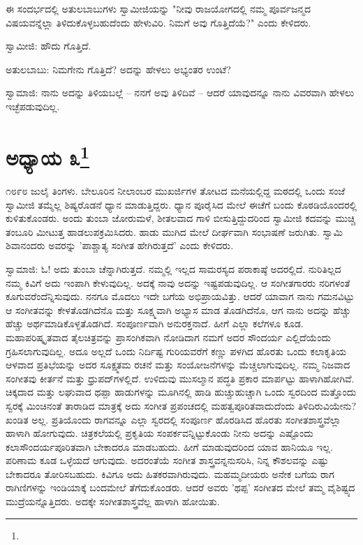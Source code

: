ಈ ಸಂದರ್ಭದಲ್ಲಿ ಅತುಲಬಾಬುಗಳು ಸ್ವಾಮೀಜಿಯನ್ನು "ನೀವು ರಾಜಯೋಗದಲ್ಲಿ ನಮ್ಮ ಪೂರ್ವಜನ್ಮದ ವಿಷಯವನ್ನೆಲ್ಲಾ ತಿಳಿದುಕೊಳ್ಳಬಹುದೆಂದು ಹೇಳುವಿರಿ. ನಿಮಗೆ ಅವು ಗೊತ್ತಿದೆಯೆ?" ಎಂದು ಕೇಳಿದರು.

ಸ್ವಾಮೀಜಿ: ಹೌದು ಗೊತ್ತಿದೆ.

ಅತುಲಬಾಬು: ನಿಮಗೇನು ಗೊತ್ತಿದೆ? ಅದನ್ನು ಹೇಳಲು ಅಭ್ಯಂತರ ಉಂಟೆ?

ಸ್ವಾಮಾಜಿ: ನಾನು ಅದನ್ನು ತಿಳಿಯಬಲ್ಲೆ – ನನಗೆ ಅವು ತಿಳಿದಿವೆ – ಆದರೆ ಯಾವುದನ್ನೂ ನಾನು ವಿವರವಾಗಿ ಹೇಳಲು ಇಚ್ಛೆಪಡುವುದಿಲ್ಲ.

\newpage

\chapter[ಅಧ್ಯಾಯ ೩]{ಅಧ್ಯಾಯ ೩\protect\footnote{}}

೧೮೯೮ ಜುಲೈ ತಿಂಗಳು. ಬೇಲೂರಿನ ನೀಲಾಂಬರ ಮುಖರ್ಜಿಗಳ ತೋಟದ ಮನೆಯಲ್ಲಿದ್ದ ಮಠದಲ್ಲಿ ಒಂದು ಸಂಜೆ ಸ್ವಾಮೀಜಿ ತಮ್ಮೆಲ್ಲ ಶಿಷ್ಯರೊಡನೆ ಧ್ಯಾನ ಮಾಡುತ್ತಿದ್ದರು. ಧ್ಯಾನ ಪೂರೈಸಿದ ಮೇಲೆ ಈಚೆಗೆ ಬಂದು ಕೊಠಡಿಯೊಂದರಲ್ಲಿ ಕುಳಿತುಕೊಂಡರು. ಅಂದು ತುಂಬಾ ಜೋರುಮಳೆ, ಶೀತಲವಾದ ಗಾಳಿ ಬೀಸುತ್ತಿದ್ದುದರಿಂದ ಸ್ವಾಮೀಜಿ ಕದವನ್ನು ಮುಚ್ಚಿ ತಂಬೂರಿ ಮೀಟುತ್ತ ಹಾಡಲುಪಕ್ರಮಿಸಿದರು. ಹಾಡು ಮುಗಿದ ಮೇಲೆ ದೀರ್ಘವಾಗಿ ಸಂಭಾಷಣೆ ಜರುಗಿತು. ಸ್ವಾಮಿ ಶಿವಾನಂದರು ಅವರನ್ನು 'ಪಾಶ್ಚಾತ್ಯ ಸಂಗೀತ ಹೇಗಿರುತ್ತದೆ' ಎಂದು ಕೇಳಿದರು.

ಸ್ವಾಮಾಜಿ: ಓ! ಅದು ತುಂಬಾ ಚೆನ್ನಾಗಿರುತ್ತದೆ. ನಮ್ಮಲ್ಲಿ ಇಲ್ಲದ ಸಾಮರಸ್ಯದ ಪರಾಕಾಷ್ಠೆ ಅದರಲ್ಲಿದೆ. ನುರಿತಿಲ್ಲದ ನಮ್ಮ ಕಿವಿಗೆ ಅದು ಇಂಪಾಗಿ ಕೇಳುವುದಿಲ್ಲ. ಅದಕ್ಕೆ ನಾವು ಅದನ್ನು ಇಷ್ಟಪಡುವುದಿಲ್ಲ. ಆ ಸಂಗೀತಗಾರರು ನರಿಗಳಂತೆ ಕೂಗುವರೆಂದೆನ್ನಿಸುವುದು. ನನಗೂ ಮೊದಲು ಇದೇ ಬಗೆಯ ಅಭಿಪ್ರಾಯವಿತ್ತು. ಆದರೆ ಯಾವಾಗ ನಾನು ಗಮನವಿಟ್ಟು ಆ ಸಂಗೀತವನ್ನು ಕೇಳತೊಡಗಿದೆನೊ ಮತ್ತು ಸೂಕ್ಷ್ಮವಾಗಿ ಅಭ್ಯಾಸ ಮಾಡ ತೊಡಗಿದೆನೊ, ಆಗ ನಾನು ಅದನ್ನು ಹೆಚ್ಚು ಹೆಚ್ಚು ಅರ್ಥಮಾಡಿಕೊಳ್ಳತೊಡಗಿದೆ. ಸಂಪೂರ್ಣವಾಗಿ ಅನುರಕ್ತನಾದೆ. ಹೀಗೆ ಎಲ್ಲಾ ಕಲೆಗಳೂ ಕೂಡ. ಮಹಾಪರಿಷ್ಕೃತವಾದ ತೈಲಚಿತ್ರವನ್ನು ಪ್ರಾಸಂಗಿಕವಾಗಿ ನೋಡಿದಾಗ ನಮಗೆ ಅದರ ಸೌಂದರ್ಯ ಎಲ್ಲಿದೆಯೆಂದು ಗ್ರಹಿಸಲಾಗುವುದಿಲ್ಲ. ಅದೂ ಅಲ್ಲದೆ ಒಂದು ನಿರ್ದಿಷ್ಟ ಗುರಿಯವರೆಗೆ ಕಣ್ಣು ಪಳಗಿದ ಹೊರತು ಒಂದು ಕಲಾಕೃತಿಯ ಆಳವಾದ ಪ್ರತಿಭೆಯನ್ನು ಅದರ ಸೂಕ್ಷ್ಮತಮ ರಚನೆ ಮತ್ತು ಸಂಯೋಜನೆಗಳನ್ನು ಮೆಚ್ಚಲಾಗುವುದಿಲ್ಲ. ನಮ್ಮ ನಿಜವಾದ ಸಂಗೀತವು ಕೀರ್ತನೆ ಮತ್ತು ಧ್ರುಪದ್‌ಗಳಲ್ಲಿದೆ. ಉಳಿದುವು ಮುಸಲ್ಮಾನ ಪದ್ಧತಿ ಪ್ರಕಾರ ಮಾರ್ಪಟ್ಟು ಹಾಳಾಗಿಹೋಗಿವೆ. ಚಿಕ್ಕದಾದ ಮತ್ತು ಲಘುವಾದ ಥಪ್ಪಾ ಹಾಡುಗಳನ್ನು ಮೂಗಿನಲ್ಲಿ ಹಾಡಿ ಹುಚ್ಚುಹುಚ್ಚಾಗಿ ಒಂದು ಸ್ವರದಿಂದ ಮತ್ತೊಂದು ಸ್ವರಕ್ಕೆ ಮಿಂಚಿನಂತೆ ತಾರಾಡಿದ ಮಾತ್ರಕ್ಕೆ ಅದು ಸಂಗೀತ ಪ್ರಪಂಚದಲ್ಲಿ ಮಹತ್ವಪೂರಿತವಾದುದೆಂದು ತಿಳಿದಿರುವಿಯೇನು? ಖಂಡಿತ ಅಲ್ಲ. ಪ್ರತಿಯೊಂದು ರಾಗವನ್ನೂ ಎಲ್ಲಾ ಸ್ವರದಲ್ಲಿ ಸಂಪೂರ್ಣ ಹೊರಡಿಸಿದ ಹೊರತು ಸಂಗೀತಶಾಸ್ತ್ರವೆಲ್ಲಾ ಹಾಳಾಗಿ ಹೋಗುವುದು. ಚಿತ್ರಕಲೆಯಲ್ಲಿ ಪ್ರಕೃತಿಯ ಸಂಪರ್ಕವನ್ನಿಟ್ಟುಕೊಂಡು ನೀನು ಅದನ್ನು ಎಷ್ಟೊಂದು ಕಲಾಸೌಂದರ್ಯಪೂರಿತವಾಗಿ ಬೇಕಾದರೂ ಮಾಡಬಹುದು. ಹೀಗೆ ಮಾಡುವುದರಿಂದ ಯಾವ ಹಾನಿಯೂ ಇಲ್ಲ. ಪರಿಣಾಮ ಕೂಡ ಒಳ್ಳೆಯದೆ ಆಗುವುದು. ಅದರಂತೆಯೆ ಸಂಗೀತ ಶಾಸ್ತ್ರವನ್ನನುಸರಿಸಿ, ನಿನ್ನ ಕೌಶಲವನ್ನು ಎಷ್ಟು ಬೇಕಾದರೂ ತೋರಿಸಬಹುದು. ಕಿವಿಗೂ ಅದು ಹಿತಕರವಾಗಿರುವುದು. ಮಹಮ್ಮದೀಯರು ಅನೇಕ ಬಗೆಯ ರಾಗ ರಾಗಿಣಿಗಳನ್ನು ಇಂಡಿಯಾಕ್ಕೆ ಬಂದಮೇಲೆ ತೆಗೆದುಕೊಂಡರು. ಆದರೆ ಅವರು 'ಥಪ್ಪ' ಸಂಗೀತದ ಮೇಲೆ ತಮ್ಮ ವೈಶಿಷ್ಟ್ಯದ ಮುದ್ರೆಯನ್ನೊತ್ತಿದರು. ಅದಕ್ಕೇ ಸಂಗೀತಶಾಸ್ತ್ರವೆಲ್ಲ ಹಾಳಾಗಿ ಹೋಯಿತು.

